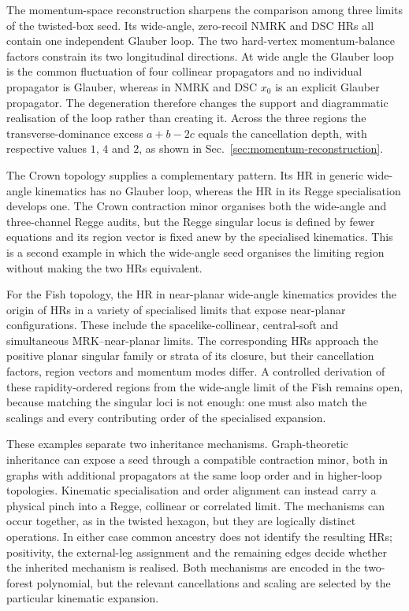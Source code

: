 \documentclass[a4paper,11pt]{article}
\begin{document}
The momentum-space reconstruction sharpens the comparison among three limits
of the twisted-box seed.  Its wide-angle, zero-recoil NMRK and DSC HRs all
contain one independent Glauber loop.
The two hard-vertex momentum-balance factors constrain its two longitudinal
directions.  At wide angle the Glauber loop
is the common fluctuation of four collinear propagators and no individual
propagator is Glauber, whereas in NMRK and DSC \(x_0\) is an explicit Glauber
propagator.  The degeneration therefore changes the support and diagrammatic
realisation of the loop rather than creating it.  Across the three regions
the transverse-dominance excess \(a+b-2c\) equals the cancellation depth,
with respective values \(1\), \(4\) and \(2\), as shown in
Sec.~\ref{sec:momentum-reconstruction}.

The Crown topology supplies a complementary pattern.  Its HR in generic
wide-angle kinematics has no Glauber loop, whereas the HR in its Regge
specialisation develops one.  The Crown contraction minor organises both the
wide-angle and three-channel
Regge audits, but the Regge singular locus is defined by fewer equations and its
region vector is fixed anew by the specialised kinematics.  This is a second
example in which the wide-angle seed organises the limiting region without
making the two HRs equivalent.

For the Fish topology, the HR in near-planar wide-angle kinematics provides
the origin of HRs in a variety of specialised limits that expose near-planar
configurations.  These include the spacelike-collinear, central-soft and
simultaneous MRK--near-planar limits.  The corresponding HRs approach the
positive planar singular family or strata of its closure, but their
cancellation factors, region vectors and momentum modes differ.
A controlled derivation of these rapidity-ordered regions from the wide-angle
limit of the Fish remains open, because matching the singular loci is not enough: one must
also match the scalings and every contributing order of the specialised
expansion.

These examples separate two inheritance mechanisms.  Graph-theoretic
inheritance can expose a seed through a compatible contraction minor, both in
graphs with additional propagators at the same loop order and in higher-loop
topologies.  Kinematic specialisation and order alignment can instead carry a
physical pinch into a Regge, collinear or correlated limit.  The mechanisms can occur together, as in the twisted
hexagon, but they are logically distinct operations.  In either
case common ancestry does not identify the resulting HRs; positivity, the
external-leg assignment and the remaining edges decide whether the inherited
mechanism is realised.  Both mechanisms are encoded in the two-forest
polynomial, but the relevant cancellations and scaling are selected by the
particular kinematic expansion.
\end{document}
